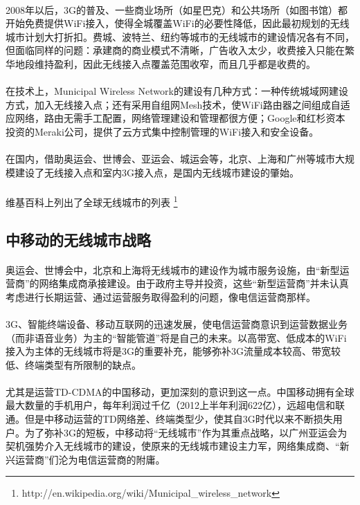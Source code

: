 \documentclass[a4paper,14pt,openany]{article}
\begin{document}
\paragraph{}
2008年以后，3G的普及、一些商业场所（如星巴克）和公共场所（如图书馆）都开始免费提供WiFi接入，使得全城覆盖WiFi的必要性降低，因此最初规划的无线城市计划大打折扣。费城、波特兰、纽约等城市的无线城市的建设情况各有不同，但面临同样的问题：承建商的商业模式不清晰，广告收入太少，收费接入只能在繁华地段维持盈利，因此无线接入点覆盖范围收窄，而且几乎都是收费的。
\paragraph{}
在技术上，Municipal Wireless Network的建设有几种方式：一种传统城域网建设方式，加入无线接入点；还有采用自组网Mesh技术，使WiFi路由器之间组成自适应网络，路由无需手工配置，网络管理建设和管理都很方便；Google和红杉资本投资的Meraki公司，提供了云方式集中控制管理的WiFi接入和安全设备。
\paragraph{}
在国内，借助奥运会、世博会、亚运会、城运会等，北京、上海和广州等城市大规模建设了无线接入点和室内3G接入点，是国内无线城市建设的肇始。
\paragraph{}
维基百科上列出了全球无线城市的列表 \footnote{http://en.wikipedia.org/wiki/Municipal\_wireless\_network}
\subsection{中移动的无线城市战略}
\paragraph{}
奥运会、世博会中，北京和上海将无线城市的建设作为城市服务设施，由“新型运营商”的网络集成商承接建设。由于政府主导并投资，这些“新型运营商”并未认真考虑进行长期运营、通过运营服务取得盈利的问题，像电信运营商那样。
\paragraph{}
3G、智能终端设备、移动互联网的迅速发展，使电信运营商意识到运营数据业务（而非语音业务）为主的“智能管道”将是自己的未来。以高带宽、低成本的WiFi接入为主体的无线城市将是3G的重要补充，能够弥补3G流量成本较高、带宽较低、终端类型有所限制的缺点。
\paragraph{}
尤其是运营TD-CDMA的中国移动，更加深刻的意识到这一点。中国移动拥有全球最大数量的手机用户，每年利润过千亿（2012上半年利润622亿），远超电信和联通。但是中移动运营的TD网络差、终端类型少，使其自3G时代以来不断损失用户。为了弥补3G的短板，中移动将“无线城市”作为其重点战略，以广州亚运会为契机强势介入无线城市的建设，使原来的无线城市建设主力军，网络集成商、“新兴运营商”们沦为电信运营商的附庸。
\end{document}
